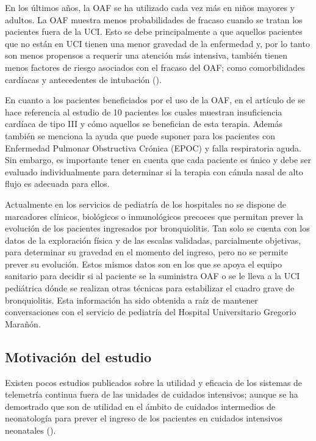 En los últimos años, la OAF se ha utilizado cada vez más en niños mayores y adultos. La OAF muestra menos probabilidades de fracaso cuando se tratan los pacientes fuera de la UCI. Esto se debe principalmente a que aquellos pacientes que no están en UCI tienen una menor gravedad de la enfermedad y, por lo tanto son menos propensos a requerir una atención más intensiva, también tienen menos factores de riesgo asociados con el fracaso del OAF; como comorbilidades cardíacas y antecedentes de intubación (\cite{Betters2017}). 

En cuanto a los pacientes beneficiados por el uso de la OAF, en el artículo de \cite{Lodeserto2018} se hace referencia al estudio de 10 pacientes los cuales muestran insuficiencia cardíaca de tipo III y cómo aquellos se benefician de esta terapia. Además también se menciona la ayuda que puede suponer para los pacientes con Enfermedad Pulmonar Obstructiva Crónica (EPOC) y falla respiratoria aguda. Sin embargo, es importante tener en cuenta que cada paciente es único y debe ser evaluado individualmente para determinar si la terapia con cánula nasal de alto flujo es adecuada para ellos.

Actualmente en los servicios de pediatría de los hospitales no se dispone de marcadores clínicos, biológicos o inmunológicos precoces que permitan prever la evolución de los pacientes ingresados por bronquiolitis. Tan solo se cuenta con los datos de la exploración física y de las escalas validadas, parcialmente objetivas, para determinar su gravedad en el momento del ingreso, pero no se permite prever su evolución. Estos mismos datos son en los que se apoya el equipo sanitario para decidir si al paciente se la suministra OAF o se le lleva a la UCI pediátrica dónde se realizan otras técnicas para estabilizar el cuadro grave de bronquiolitis. Esta información ha sido obtenida a raíz de mantener conversaciones con el servicio de pediatría del Hospital Universitario Gregorio Marañón.


\subsection{Motivación del estudio}

Existen pocos estudios publicados sobre la utilidad y eficacia de los sistemas de telemetría continua fuera de las unidades de cuidados intensivos; aunque se ha demostrado que son de utilidad en el ámbito de cuidados intermedios de neonatología para prever el ingreso de los pacientes en cuidados intensivos neonatales (\cite{Solis2022}).

